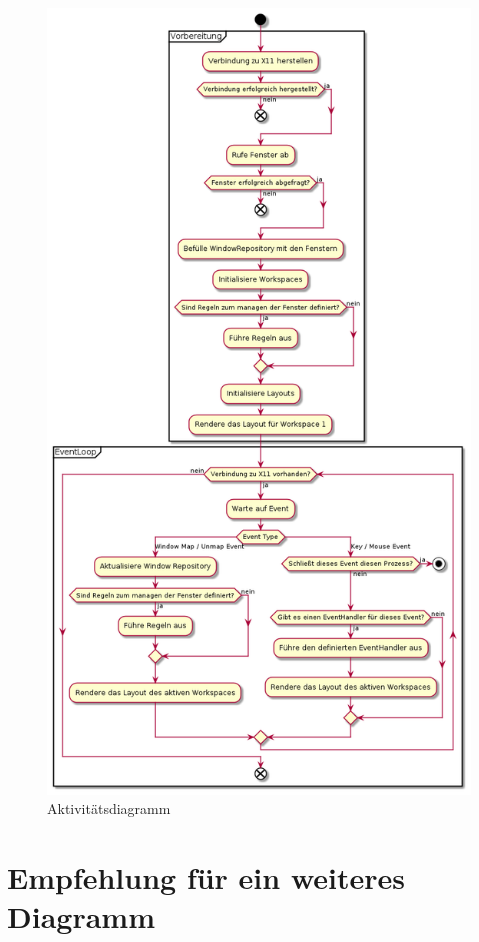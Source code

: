 \documentclass{article}
\begin{document}
\begin{figure}[h]
	\centering
	\includegraphics[height=0.725\textheight]{activity}
	\caption{Aktivitätsdiagramm}
\end{figure}

\vfill

\newpage

\section{Empfehlung für ein weiteres Diagramm}
\end{document}
